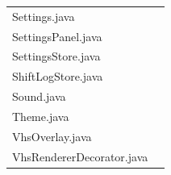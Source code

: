 \documentclass[11pt,a4paper]{article}
\begin{document}
\begin{minipage}[t]{.485\linewidth}
\begin{tabularx}{\linewidth}{Xr}
Settings.java&\hyperref[file:Settings]{\pageref*{file:Settings}}\\
SettingsPanel.java&\hyperref[file:SettingsPanel]{\pageref*{file:SettingsPanel}}\\
SettingsStore.java&\hyperref[file:SettingsStore]{\pageref*{file:SettingsStore}}\\
ShiftLogStore.java&\hyperref[file:ShiftLogStore]{\pageref*{file:ShiftLogStore}}\\
Sound.java&\hyperref[file:Sound]{\pageref*{file:Sound}}\\
Theme.java&\hyperref[file:Theme]{\pageref*{file:Theme}}\\
VhsOverlay.java&\hyperref[file:VhsOverlay]{\pageref*{file:VhsOverlay}}\\
VhsRendererDecorator.java&\hyperref[file:VhsRendererDecorator]{\pageref*{file:VhsRendererDecorator}}\\
\bottomrule\end{tabularx}\par\end{minipage}
\end{document}
